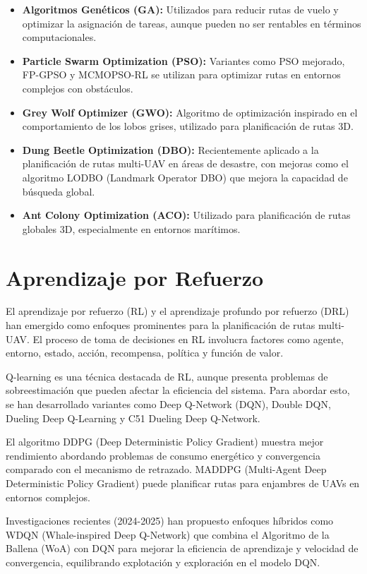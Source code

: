 \documentclass[12pt]{report} %
\begin{document}
\begin{itemize}
	\item \textbf{Algoritmos Genéticos (GA):} Utilizados para reducir rutas de vuelo y optimizar la asignación de tareas, aunque pueden no ser rentables en términos computacionales.
	\item \textbf{Particle Swarm Optimization (PSO):} Variantes como PSO mejorado, FP-GPSO y MCMOPSO-RL se utilizan para optimizar rutas en entornos complejos con obstáculos.
	\item \textbf{Grey Wolf Optimizer (GWO):} Algoritmo de optimización inspirado en el comportamiento de los lobos grises, utilizado para planificación de rutas 3D\cite{huang2024}.
	\item \textbf{Dung Beetle Optimization (DBO):} Recientemente aplicado a la planificación de rutas multi-UAV en áreas de desastre, con mejoras como el algoritmo LODBO (Landmark Operator DBO) que mejora la capacidad de búsqueda global.
	\item \textbf{Ant Colony Optimization (ACO):} Utilizado para planificación de rutas globales 3D, especialmente en entornos marítimos.
\end{itemize}

\section{Aprendizaje por Refuerzo}

El aprendizaje por refuerzo (RL) y el aprendizaje profundo por refuerzo (DRL) han emergido como enfoques prominentes para la planificación de rutas multi-UAV\cite{hayat2020, yue2025}. El proceso de toma de decisiones en RL involucra factores como agente, entorno, estado, acción, recompensa, política y función de valor.

Q-learning es una técnica destacada de RL, aunque presenta problemas de sobreestimación que pueden afectar la eficiencia del sistema. Para abordar esto, se han desarrollado variantes como Deep Q-Network (DQN), Double DQN, Dueling Deep Q-Learning y C51 Dueling Deep Q-Network.

El algoritmo DDPG (Deep Deterministic Policy Gradient) muestra mejor rendimiento abordando problemas de consumo energético y convergencia comparado con el mecanismo de retrazado. MADDPG (Multi-Agent Deep Deterministic Policy Gradient) puede planificar rutas para enjambres de UAVs en entornos complejos\cite{jeon2024}.

Investigaciones recientes (2024-2025) han propuesto enfoques híbridos como WDQN (Whale-inspired Deep Q-Network)\cite{wang2025} que combina el Algoritmo de la Ballena (WoA) con DQN para mejorar la eficiencia de aprendizaje y velocidad de convergencia, equilibrando explotación y exploración en el modelo DQN.
\end{document}
